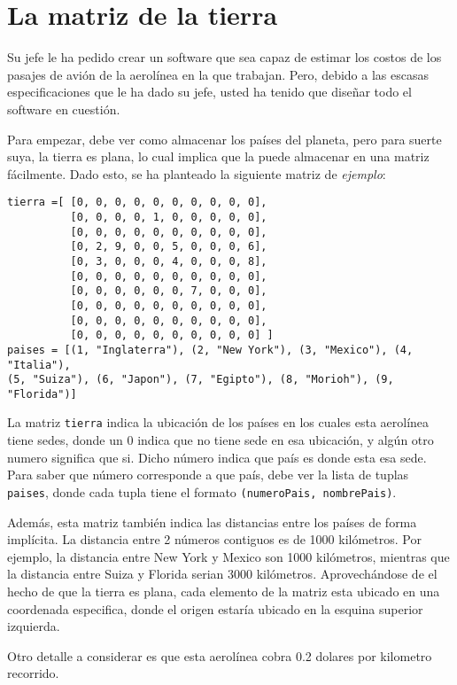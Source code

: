 \section{La matriz de la tierra}

Su jefe le ha pedido crear un software que sea capaz de estimar los costos de los pasajes de avión de la aerolínea en la que trabajan. Pero, debido a las escasas especificaciones que le ha dado su jefe, usted ha tenido que diseñar todo el software en cuestión.

Para empezar, debe ver como almacenar los países del planeta, pero para suerte suya, la tierra es plana, lo cual implica que la puede almacenar en una matriz fácilmente. Dado esto, se ha planteado la siguiente matriz de \textit{ejemplo}:

\begin{lstlisting}[style=consola]
tierra =[ [0, 0, 0, 0, 0, 0, 0, 0, 0, 0], 
          [0, 0, 0, 0, 1, 0, 0, 0, 0, 0], 
          [0, 0, 0, 0, 0, 0, 0, 0, 0, 0], 
          [0, 2, 9, 0, 0, 5, 0, 0, 0, 6], 
          [0, 3, 0, 0, 0, 4, 0, 0, 0, 8], 
          [0, 0, 0, 0, 0, 0, 0, 0, 0, 0], 
          [0, 0, 0, 0, 0, 0, 7, 0, 0, 0], 
          [0, 0, 0, 0, 0, 0, 0, 0, 0, 0], 
          [0, 0, 0, 0, 0, 0, 0, 0, 0, 0], 
          [0, 0, 0, 0, 0, 0, 0, 0, 0, 0] ]
paises = [(1, "Inglaterra"), (2, "New York"), (3, "Mexico"), (4, "Italia"), 
(5, "Suiza"), (6, "Japon"), (7, "Egipto"), (8, "Morioh"), (9, "Florida")]
\end{lstlisting}

La matriz \texttt{tierra} indica la ubicación de los países en los cuales esta aerolínea tiene sedes, donde un 0 indica que no tiene sede en esa ubicación, y algún otro numero significa que si. Dicho número indica que país es donde esta esa sede. Para saber que número corresponde a que país, debe ver la lista de tuplas \texttt{paises}, donde cada tupla tiene el formato \texttt{(numeroPais, nombrePais)}.

Además, esta matriz también indica las distancias entre los países de forma implícita. La distancia entre 2 números contiguos es de 1000 kilómetros. Por ejemplo, la distancia entre New York y Mexico son 1000 kilómetros, mientras que la distancia entre Suiza y Florida serian 3000 kilómetros. Aprovechándose de el hecho de que la tierra es plana, cada elemento de la matriz esta ubicado en una coordenada especifica, donde el origen estaría ubicado en la esquina superior izquierda.

Otro detalle a considerar es que esta aerolínea cobra 0.2 dolares por kilometro recorrido.

